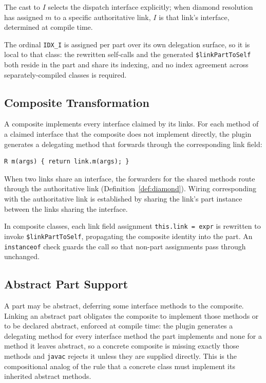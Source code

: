 \documentclass[acmsmall,nonacm]{acmart}
\theoremstyle{acmplain}
\theoremstyle{acmdefinition}
\newcommand{\code}[1]{\texttt{#1}}
\begin{document}
The cast to $I$ selects the dispatch interface explicitly; when diamond
resolution has assigned $m$ to a specific authoritative link, $I$ is that
link's interface, determined at compile time.

The ordinal \code{IDX\_I} is assigned per part over its own
delegation surface, so it is local to that class: the rewritten self-calls and
the generated \code{\$linkPartToSelf} both reside in the part and share its
indexing, and no index agreement across separately-compiled classes is required.

\subsection{Composite Transformation}

A composite implements every interface claimed by its links. For each method of
a claimed interface that the composite does not implement directly, the plugin
generates a delegating method that forwards through the corresponding
link field:

\begin{lstlisting}
R m(args) { return link.m(args); }
\end{lstlisting}

When two links share an interface, the forwarders for the
shared methods route through the authoritative link
(Definition~\ref{def:diamond}). Wiring corresponding with the authoritative
link is established by sharing the link's part instance between the links
sharing the interface.

In composite classes, each link field assignment \code{this.link = expr}
is rewritten to invoke \code{\$linkPartToSelf}, propagating the composite
identity into the part. An \code{instanceof} check guards the call so
that non-part assignments pass through unchanged.

\subsection{Abstract Part Support}

A part may be abstract, deferring some interface methods to the
composite. Linking an abstract part obligates the composite to implement those
methods or to be declared abstract, enforced at compile time: the plugin
generates a delegating method for every interface method the part implements and
none for a method it leaves abstract, so a concrete composite is missing exactly
those methods and \texttt{javac} rejects it unless they are supplied directly.
This is the compositional analog of the rule that a concrete class must implement
its inherited abstract methods.
\end{document}
